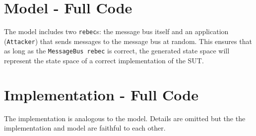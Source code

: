 \documentclass{article}
\begin{document}


\newpage
\begin{appendices}

\section{\Rebeca Model - Full Code}



The \Rebeca model includes two \texttt{rebec}s: the message bus itself and an application (\texttt{Attacker}) that sends messages to the message bus at random. This ensures that as long as the \texttt{MessageBus rebec} is correct, the generated state space will represent the state space of a correct implementation of the SUT.

\newpage
\section{Implementation - Full Code}



The implementation is analogous to the \Rebeca model. Details are omitted but the the implementation and model are faithful to each other. 

\end{appendices}
\end{document}
